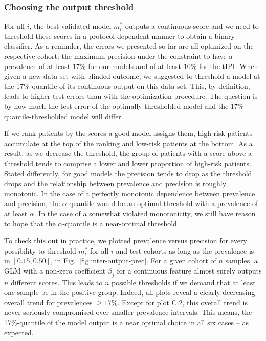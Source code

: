 \subsubsection{Choosing the output threshold}




For all $i$, the best validated model $m_i^*$ outputs a continuous score and we need to threshold 
these scores in a protocol-dependent manner to obtain a binary classifier. As a reminder, the errors 
we presented so far are all optimized on the respective cohort: the maximum precision under the 
constraint to have a prevalence of at least \num{17}\% for our models and of at least \num{10}\% 
for the tIPI. When given a new data set with blinded outcome, we suggested to threshold a model at 
the \num{17}\%-quantile of its continuous output on this data set. This, by definition, leads to 
higher test errors than with the optimization procedure. The question is by how much the test error 
of the optimally thresholded model and the \num{17}\%-quantile-thresholded model will differ.

If we rank patients by the scores a good model assigns them, high-risk patients accumulate at the 
top of the ranking and low-risk patients at the bottom. As a result, as we decrease the threshold, 
the group of patients with a score above a threshold tends to comprise a lower and lower proportion 
of high-risk patients. Stated differently, for good models the precision tends to drop as the 
threshold drops and the relationship between prevalence and precision is roughly monotonic. In the 
case of a perfectly monotonic dependence between prevalence and precision, the $\alpha$-quantile 
would be an optimal threshold with a prevalence of at least $\alpha$. 
In the case of a somewhat violated monotonicity, we still have reason to hope that the 
$\alpha$-quantile is a near-optimal threshold.

To check this out in practice, we plotted prevalence versus precision for every possibility to 
threshold $m^*_i$ for all $i$ and test cohorts as long as the prevalence is in $[\num{0.15}, 
\num{0.50}]$, in Fig.\ \ref{fig:inter-output-prec}. For a given 
cohort of $n$ samples, a GLM with a non-zero coefficient $\beta_j$ for a continuous feature almost 
surely outputs $n$ different scores. This leads to $n$ possible thresholds if we demand that at 
least one sample be in the positive group. Indeed, all 
plots reveal a clearly decreasing overall trend for prevalences $\geq \num{17}\%$. 
Except for plot C.2, this overall trend is never seriously compromised over smaller 
prevalence intervals. This means, the \num{17}\%-quantile of the model output is a near optimal 
choice in all six cases -- as expected.

